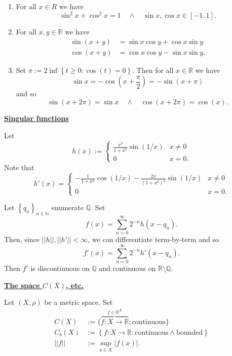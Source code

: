 \documentclass{notes}
\begin{document}
\newpage

\begin{lem}
  \begin{enumerate}
    \item For all $x \in R$ we have
    \[
      \sin^2 x + \cos^2 x = 1 \quad \land \quad \sin x, \cos x \in [-1, 1].
    \]

    \item For all $x, y \in \mathbb R$ we have 
    \begin{align*}
      \sin(x + y) &= \sin x \cos y + \cos x \sin y \\ 
      \cos(x + y) &= \cos x \cos y - \sin x \sin y.
    \end{align*}
    
    \item Set $\pi := 2 \inf \left \{ t \geq 0 : \cos(t) = 0 \right \}$.
    Then for all $x \in \mathbb R$ we have 
    \[
      \sin x = -\cos \left ( x + \frac{\pi}{2} \right ) = -\sin(x + \pi)
    \]
    and so 
    \[
      \sin(x + 2 \pi) = \sin x \quad \land \quad \cos(x + 2 \pi) = \cos(x).
    \]
  \end{enumerate}
\end{lem}

{\boldmath \bfseries \underline{Singular functions}}

Let 
\[
  h(x) := \begin{cases}
    \frac{x^2}{1 + x^2} \sin(1 / x) & x \neq 0 \\ 
    0 & x = 0.
  \end{cases}
\]
Note that 
\[
  h'(x) = \begin{cases}
    -\frac{1}{1 + x^2} \cos(1 / x) - \frac{2 x}{(1 + x^2)^2} \sin(1 / x) & x \neq 0 \\ 
    0 & x = 0.
  \end{cases}
\]

Let $\left \{ q_n \right \}_{n \in \mathbb N}$ enumerate $\mathbb Q$.
Set 
\[
  f(x) = \sum_{n = 0}^\infty 2^{-n} h(x - q_n).
\]
Then, since $||h||, ||h'|| < \infty$, we can differentiate term-by-term and so 
\[
  f'(x) = \sum_{n = 0}^\infty 2^{-n} h'(x - q_n).
\]
Then $f'$ is discontinuous on $\mathbb Q$ and continuous on $\mathbb R \setminus \mathbb Q$.

\newpage

{\boldmath \bfseries \underline{The space $C(X)$, etc.}}

\begin{defn}
  Let $(X, \rho)$ be a metric space.
  Set 
  \begin{align*}
    C(X) &:= \big \{ \overbrace{f \colon X \to \mathbb R}^{f \in \mathbb R^X} : \text{continuous} \big \} \\ 
    C_b(X) &:= \left \{ f \colon X \to \mathbb R : \text{continuous} \land \text{bounded} \right \} \\ 
    ||f|| &:= \sup_{x \in X} | f(x) |.
  \end{align*}
\end{defn}
\end{document}
